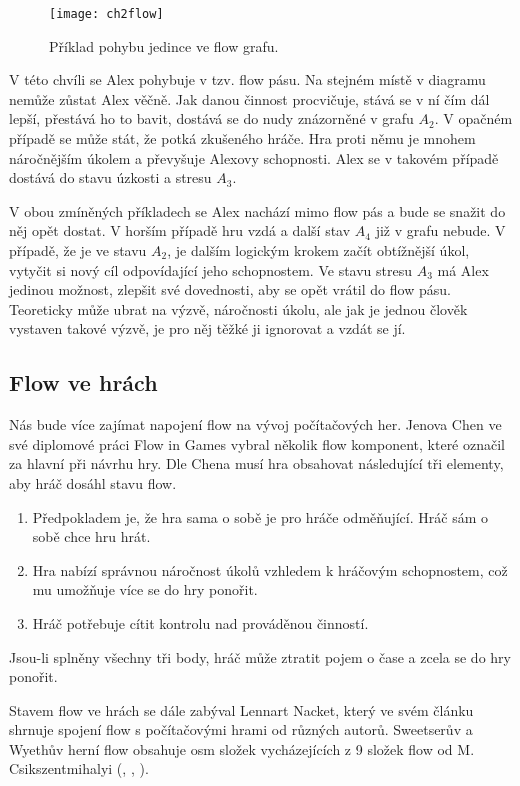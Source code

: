 \begin{figure}
  \centering
  \texttt{[image: ch2flow]}
	\caption{Příklad pohybu jedince ve flow grafu. }
	\label{fig:ch2flow}
\end{figure}

V této chvíli se Alex pohybuje v tzv. flow pásu. Na stejném místě v diagramu nemůže zůstat Alex věčně. Jak danou činnost procvičuje, stává se v ní čím dál lepší, přestává ho to bavit, dostává se do nudy znázorněné v grafu $A_2$. V opačném případě se může stát, že potká zkušeného hráče. Hra proti němu je mnohem náročnějším úkolem a převyšuje Alexovy schopnosti. Alex se v takovém případě dostává do stavu úzkosti a stresu $A_3$.

V obou zmíněných příkladech se Alex nachází mimo flow pás a bude se snažit do něj opět dostat. V horším případě hru vzdá a další stav $A_4$ již v grafu nebude. V případě, že je ve stavu $A_2$, je dalším logickým krokem začít obtížnější úkol, vytyčit si nový cíl odpovídající jeho schopnostem. Ve stavu stresu $A_3$ má Alex jedinou možnost, zlepšit své dovednosti, aby se opět vrátil do flow pásu. Teoreticky může ubrat na výzvě, náročnosti úkolu, ale jak je jednou člověk vystaven takové výzvě, je pro něj těžké ji ignorovat a vzdát se jí\cite{OptimalFun}. 

\subsection{Flow ve hrách}

Nás bude více zajímat napojení flow na vývoj počítačových her. Jenova Chen ve své diplomové práci Flow in Games\cite{thesisflow} vybral několik flow komponent, které označil za hlavní při návrhu hry. Dle Chena musí hra obsahovat následující tři elementy, aby hráč dosáhl stavu flow.

\begin{enumerate}
	\item Předpokladem je, že hra sama o sobě je pro hráče odměňující. Hráč sám o sobě chce hru hrát.
	\item Hra nabízí správnou náročnost úkolů vzhledem k hráčovým schopnostem, což mu umožňuje více se do hry ponořit.
	\item Hráč potřebuje cítit kontrolu nad prováděnou činností.
\end{enumerate}

Jsou-li splněny všechny tři body, hráč může ztratit pojem o čase a zcela se do hry ponořit.

Stavem flow ve hrách se dále zabýval Lennart Nacket, který ve svém článku\cite{FlowAll} shrnuje spojení flow s počítačovými hrami od různých autorů. Sweetserův a Wyethův herní flow obsahuje osm složek vycházejících z 9 složek flow od M. Csikszentmihalyi (\cite{OptimalFun}, \cite{FlowEng}, \cite{FlowCZ}).

